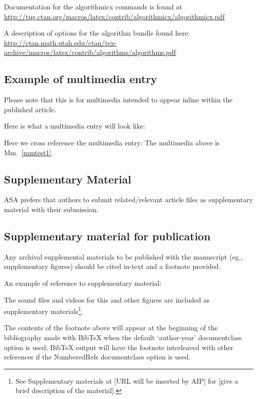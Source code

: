 \documentclass[preprint]{JASA}
\begin{document}
Documentation for the algorithmicx  commands is found at\\
\url{http://tug.ctan.org/macros/latex/contrib/algorithmicx/algorithmicx.pdf}

A description of options for the algorithm bundle found here:\\
\url{http://ctan.math.utah.edu/ctan/tex-archive/macros/latex/contrib/algorithms/algorithms.pdf}

\subsection{Example of multimedia entry}
Please note that this is for multimedia intended to appear inline
within the published article. 

Here is what a multimedia entry will look like:
\label{mmtest1}

Here we  cross reference the multimedia entry: The multimedia
above is Mm.~\ref{mmtest1}.

\subsection{Supplementary Material}
ASA
prefers that authors to submit related/relevant article files as
supplementary material with their submission.

\subsection{Supplementary material for publication}
Any archival supplemental materials to be published with the
manuscript (eg., supplementary figures) should be cited in-text and a footnote provided.

An example of reference to supplementary material:

The sound files and videos for this and other figures
are included as supplementary materials\footnote{See
Supplementary materials at [URL will be inserted by AIP]
for [give a brief description of the material].}.

The contents of the footnote above will appear at the beginning of the
bibliography made with BibTeX when the default `author-year' documentclass option is used;
BibTeX output will have the footnote interleaved with other
references if the NumberedRefs documentclass option is used.
\end{document}
